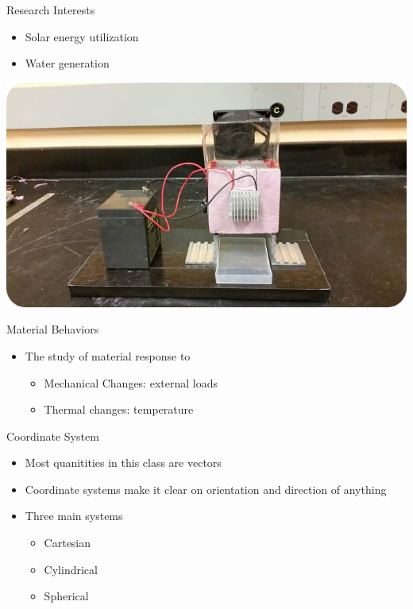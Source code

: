 \documentclass[10pt, svgnames]{beamer}
\begin{document}
\begin{frame}[label={sec:orgcdc0e6c}]{Research Interests}
\begin{itemize}
\item Solar energy utilization

\item Water generation
\end{itemize}

\begin{center}
\includegraphics[width=.9\linewidth]{pictures/awg.jpg}
\end{center}
\end{frame}

\begin{frame}[label={sec:org3d71f2d}]{Material Behaviors}
\begin{itemize}
\item The study of material response to

\begin{itemize}
\item Mechanical Changes: external loads

\item Thermal changes: temperature
\end{itemize}
\end{itemize}
\end{frame}

\begin{frame}[label={sec:orgf4f8e7d}]{Coordinate System}
\begin{itemize}
\item Most quanitities in this class are vectors

\item Coordinate systems make it clear on orientation and direction of anything

\item Three main systems

\begin{itemize}
\item Cartesian

\item Cylindrical

\item Spherical
\end{itemize}
\end{itemize}
\end{frame}
\end{document}
